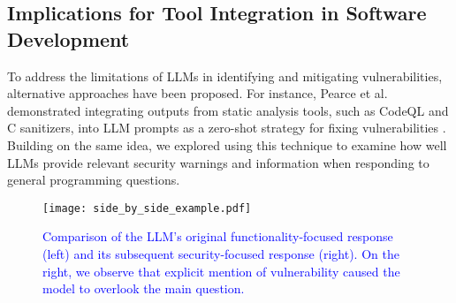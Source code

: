 \subsection{Implications for Tool Integration in Software Development}
\label{implications_tool_integration}



To address the limitations of LLMs in identifying and mitigating vulnerabilities, alternative approaches have been proposed. 
For instance, Pearce et al. demonstrated integrating outputs from static analysis tools, such as CodeQL and C sanitizers, into LLM prompts as a zero-shot strategy for fixing vulnerabilities \cite{pearce2023examining}. 
Building on the same idea, we explored using this technique to examine how well LLMs provide relevant security warnings and information when responding to general programming questions.


\begin{figure*}[t]
    \centering
    \texttt{[image: side\_by\_side\_example.pdf]}
    \caption{\textcolor{blue}{Comparison of the LLM’s original functionality-focused response (left) and its subsequent security-focused response (right). On the right, we observe that explicit mention of vulnerability caused the model to overlook the main question.}}
    \label{fig:side_by_side_example}
\end{figure*}

